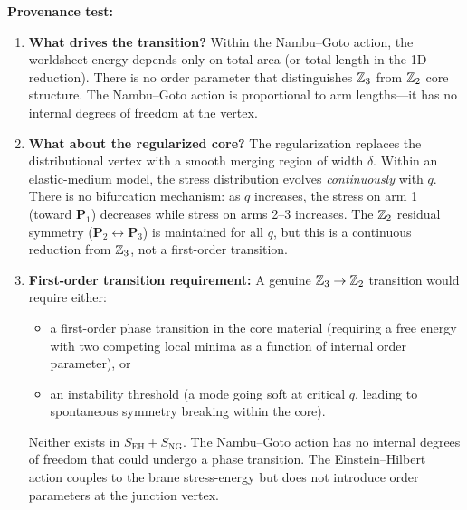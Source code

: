 \textbf{Provenance test:}
\begin{enumerate}
    \item \textbf{What drives the transition?} Within the Nambu--Goto
          action, the worldsheet energy depends only on total area (or
          total length in the 1D reduction). There is no order parameter
          that distinguishes $\mathbb{Z}_3$ from $\mathbb{Z}_2$ core structure.
          The Nambu--Goto action is proportional to arm lengths---it has
          no internal degrees of freedom at the vertex.

    \item \textbf{What about the regularized core?} The regularization
          replaces the distributional vertex with a smooth merging region
          of width $\delta$. Within an elastic-medium model, the stress
          distribution evolves \emph{continuously} with $q$. There is no
          bifurcation mechanism: as $q$ increases, the stress on arm 1
          (toward $\mathbf{P}_1$) decreases while stress on arms 2--3
          increases. The $\mathbb{Z}_2$ residual symmetry ($\mathbf{P}_2
          \leftrightarrow \mathbf{P}_3$) is maintained for all $q$, but
          this is a continuous reduction from $\mathbb{Z}_3$, not a
          first-order transition.

    \item \textbf{First-order transition requirement:} A genuine
          $\mathbb{Z}_3 \to \mathbb{Z}_2$ transition would require either:
          \begin{itemize}
              \item[(a)] a first-order phase transition in the core
                    material (requiring a free energy with two competing
                    local minima as a function of internal order parameter),
                    or
              \item[(b)] an instability threshold (a mode going soft at
                    critical $q$, leading to spontaneous symmetry breaking
                    within the core).
          \end{itemize}
          Neither exists in $S_{\mathrm{EH}} + S_{\mathrm{NG}}$. The
          Nambu--Goto action has no internal degrees of freedom that could
          undergo a phase transition. The Einstein--Hilbert action couples
          to the brane stress-energy but does not introduce order parameters
          at the junction vertex.
\end{enumerate}

